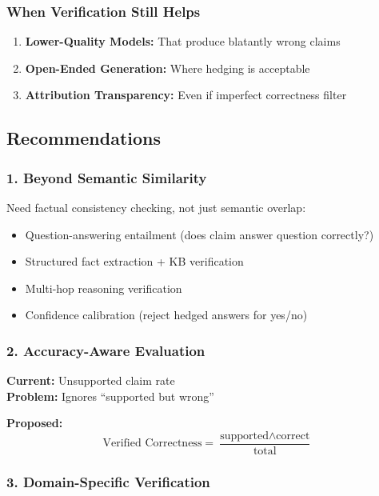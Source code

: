 \documentclass[11pt]{article}
\begin{document}
\subsubsection{When Verification Still Helps}

\begin{enumerate}
\item \textbf{Lower-Quality Models:} That produce blatantly wrong claims
\item \textbf{Open-Ended Generation:} Where hedging is acceptable
\item \textbf{Attribution Transparency:} Even if imperfect correctness filter
\end{enumerate}

\subsection{Recommendations}

\subsubsection{1. Beyond Semantic Similarity}

Need factual consistency checking, not just semantic overlap:
\begin{itemize}
\item Question-answering entailment (does claim answer question correctly?)
\item Structured fact extraction + KB verification
\item Multi-hop reasoning verification
\item Confidence calibration (reject hedged answers for yes/no)
\end{itemize}

\subsubsection{2. Accuracy-Aware Evaluation}

\textbf{Current:} Unsupported claim rate\\
\textbf{Problem:} Ignores ``supported but wrong''

\textbf{Proposed:}
\[
\text{Verified Correctness} = \frac{\text{supported} \wedge \text{correct}}{\text{total}}
\]

\subsubsection{3. Domain-Specific Verification}
\end{document}
